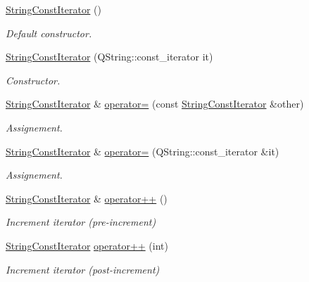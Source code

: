 \begin{DoxyCompactItemize}
\item 
\hyperlink{struct_mdt_1_1_plain_text_1_1_string_const_iterator_aebc75afef8accb5faf0dc33d065f898f}{String\+Const\+Iterator} ()
\begin{DoxyCompactList}\small\item\em Default constructor. \end{DoxyCompactList}\item 
\hyperlink{struct_mdt_1_1_plain_text_1_1_string_const_iterator_ae2cad12d2b7751eaf0a00a69678275ec}{String\+Const\+Iterator} (Q\+String\+::const\+\_\+iterator it)
\begin{DoxyCompactList}\small\item\em Constructor. \end{DoxyCompactList}\item 
\hyperlink{struct_mdt_1_1_plain_text_1_1_string_const_iterator}{String\+Const\+Iterator} \& \hyperlink{struct_mdt_1_1_plain_text_1_1_string_const_iterator_a5ff7bd8002a95fcb2e1aed0a27d4d60c}{operator=} (const \hyperlink{struct_mdt_1_1_plain_text_1_1_string_const_iterator}{String\+Const\+Iterator} \&other)
\begin{DoxyCompactList}\small\item\em Assignement. \end{DoxyCompactList}\item 
\hyperlink{struct_mdt_1_1_plain_text_1_1_string_const_iterator}{String\+Const\+Iterator} \& \hyperlink{struct_mdt_1_1_plain_text_1_1_string_const_iterator_acff7207d9b0257518a2845dbbce19f0f}{operator=} (Q\+String\+::const\+\_\+iterator \&it)
\begin{DoxyCompactList}\small\item\em Assignement. \end{DoxyCompactList}\item 
\hyperlink{struct_mdt_1_1_plain_text_1_1_string_const_iterator}{String\+Const\+Iterator} \& \hyperlink{struct_mdt_1_1_plain_text_1_1_string_const_iterator_a289ce7f324a31e2d0977ba6e9b5460dc}{operator++} ()
\begin{DoxyCompactList}\small\item\em Increment iterator (pre-\/increment) \end{DoxyCompactList}\item 
\hyperlink{struct_mdt_1_1_plain_text_1_1_string_const_iterator}{String\+Const\+Iterator} \hyperlink{struct_mdt_1_1_plain_text_1_1_string_const_iterator_a107f05451d845ef3371adc7300f52b03}{operator++} (int)
\begin{DoxyCompactList}\small\item\em Increment iterator (post-\/increment) \end{DoxyCompactList}\item 

\end{DoxyCompactItemize}
